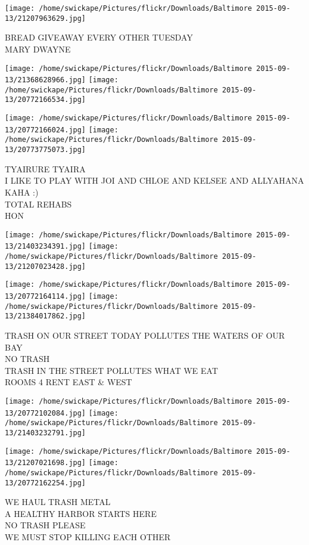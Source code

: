 \documentclass[10pt,letterpaper]{article}
\begin{document}
\vspace{0.25in}
\texttt{[image: /home/swickape/Pictures/flickr/Downloads/Baltimore 2015-09-13/21207963629.jpg]}

BREAD GIVEAWAY EVERY OTHER TUESDAY\\
MARY DWAYNE
\pagebreak

\texttt{[image: /home/swickape/Pictures/flickr/Downloads/Baltimore 2015-09-13/21368628966.jpg]}
\texttt{[image: /home/swickape/Pictures/flickr/Downloads/Baltimore 2015-09-13/20772166534.jpg]}

\texttt{[image: /home/swickape/Pictures/flickr/Downloads/Baltimore 2015-09-13/20772166024.jpg]}
\texttt{[image: /home/swickape/Pictures/flickr/Downloads/Baltimore 2015-09-13/20773775073.jpg]}

TYAIRURE TYAIRA\\
I LIKE TO PLAY WITH JOI AND CHLOE AND KELSEE AND ALLYAHANA KAHA :)\\
TOTAL REHABS\\
HON
\pagebreak

\texttt{[image: /home/swickape/Pictures/flickr/Downloads/Baltimore 2015-09-13/21403234391.jpg]}
\texttt{[image: /home/swickape/Pictures/flickr/Downloads/Baltimore 2015-09-13/21207023428.jpg]}

\texttt{[image: /home/swickape/Pictures/flickr/Downloads/Baltimore 2015-09-13/20772164114.jpg]}
\texttt{[image: /home/swickape/Pictures/flickr/Downloads/Baltimore 2015-09-13/21384017862.jpg]}

TRASH ON OUR STREET TODAY POLLUTES THE WATERS OF OUR BAY\\
NO TRASH\\
TRASH IN THE STREET POLLUTES WHAT WE EAT\\
ROOMS 4 RENT EAST \& WEST
\pagebreak

\texttt{[image: /home/swickape/Pictures/flickr/Downloads/Baltimore 2015-09-13/20772102084.jpg]}
\texttt{[image: /home/swickape/Pictures/flickr/Downloads/Baltimore 2015-09-13/21403232791.jpg]}

\texttt{[image: /home/swickape/Pictures/flickr/Downloads/Baltimore 2015-09-13/21207021698.jpg]}
\texttt{[image: /home/swickape/Pictures/flickr/Downloads/Baltimore 2015-09-13/20772162254.jpg]}

WE HAUL TRASH METAL\\
A HEALTHY HARBOR STARTS HERE\\
NO TRASH PLEASE\\
WE MUST STOP KILLING EACH OTHER
\pagebreak
\end{document}
